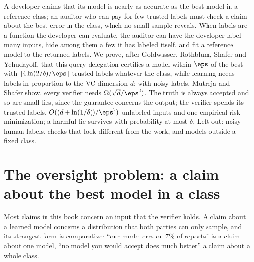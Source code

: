 \newcommand{\pacverifyuc}{m^{\mathrm{UC}}_{\cH}}
\newcommand{\pacverifyfam}{\mathbb{D}}

\begin{refsection}

\begin{chaptersummary}
A developer claims that its model is nearly as accurate as the best model in a reference class; an auditor who can pay for few trusted labels must check a claim about the best error in the class, which no small sample reveals. When labels are a function the developer can evaluate, the auditor can have the developer label many inputs, hide among them a few it has labeled itself, and fit a reference model to the returned labels. We prove, after Goldwasser, Rothblum, Shafer and Yehudayoff, that this query delegation certifies a model within $\eps$ of the best with $\lceil4\ln(2/\delta)/\eps\rceil$ trusted labels whatever the class, while learning needs labels in proportion to the VC dimension $d$; with noisy labels, Mutreja and Shafer show, every verifier needs $\Omega(\sqrt d/\eps^2)$. The truth is always accepted and so are small lies, since the guarantee concerns the output; the verifier spends its trusted labels, $O((d+\ln(1/\delta))/\eps^2)$ unlabeled inputs and one empirical risk minimization; a harmful lie survives with probability at most $\delta$. Left out: noisy human labels, checks that look different from the work, and models outside a fixed class.
\end{chaptersummary}

\section{The oversight problem: a claim about the best model in a class}\label{sec:pacverify:problem}

Most claims in this book concern an input that the verifier holds. A claim about a learned model concerns a distribution that both parties can only sample, and its strongest form is comparative: ``our model errs on $7\%$ of reports'' is a claim about one model, ``no model you would accept does much better'' a claim about a whole class.


\end{refsection}
